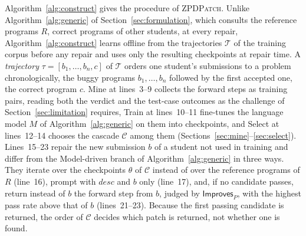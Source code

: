\documentclass[conference]{IEEEtran}
\begin{document}
Algorithm~\ref{alg:construct} gives the procedure of \textsc{ZPDPatch}. Unlike Algorithm~\ref{alg:generic} of Section~\ref{sec:formulation}, which consults the reference programs \(R\), correct programs of other students, at every repair, Algorithm~\ref{alg:construct} learns offline from the trajectories \(\mathcal T\) of the training corpus before any repair and uses only the resulting checkpoints at repair time. A \emph{trajectory} \(\tau=[b_1,\ldots,b_n,c]\) of \(\mathcal T\) orders one student's submissions to a problem chronologically, the buggy programs \(b_1,\ldots,b_n\) followed by the first accepted one, the correct program \(c\). Mine at lines~3--9 collects the forward steps as training pairs, reading both the verdict and the test-case outcomes as the challenge of Section~\ref{sec:limitation} requires, Train at lines~10--11 fine-tunes the language model \(M\) of Algorithm~\ref{alg:generic} on them into checkpoints, and Select at lines~12--14 chooses the cascade \(\mathcal C\) among them (Sections~\ref{sec:mine}--\ref{sec:select}). Lines~15--23 repair the new submission \(b\) of a student not used in training and differ from the Model-driven branch of Algorithm~\ref{alg:generic} in three ways. They iterate over the checkpoints \(\theta\) of \(\mathcal C\) instead of over the reference programs of \(R\) (line~16), prompt with \(\mathit{desc}\) and \(b\) only (line~17), and, if no candidate passes, return instead of \(b\) the forward step from \(b\), judged by \(\mathsf{Improves}_P\), with the highest pass rate above that of \(b\) (lines~21--23). Because the first passing candidate is returned, the order of \(\mathcal C\) decides which patch is returned, not whether one is found.
\end{document}

